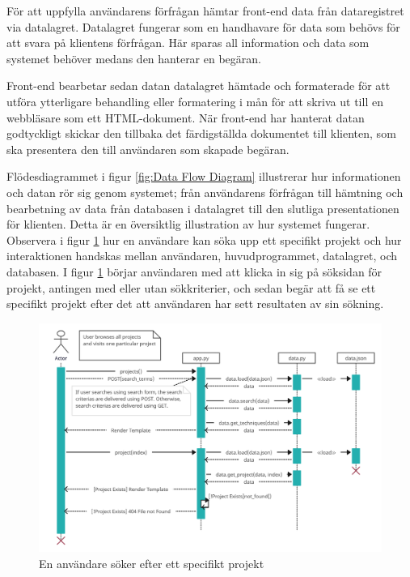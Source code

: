 \documentclass{liu_mall}
\begin{document}
        För att uppfylla användarens förfrågan hämtar front-end data från dataregistret via datalagret. Datalagret fungerar som en handhavare för data som behövs för att svara på klientens förfrågan. Här sparas all information och data som systemet behöver medans den hanterar en begäran.
        
        Front-end bearbetar sedan datan datalagret hämtade och formaterade för att utföra ytterligare behandling eller formatering i mån för att skriva ut till en webbläsare som ett HTML-dokument. När front-end har hanterat datan godtyckligt 
        skickar den tillbaka det färdigställda dokumentet till klienten, som ska presentera den till användaren som skapade begäran.
        
        Flödesdiagrammet i figur \ref{fig:Data Flow Diagram} illustrerar hur informationen och datan rör sig genom systemet; från användarens förfrågan till hämtning och bearbetning av data från databasen i datalagret till den slutliga presentationen för klienten. Detta är en översiktlig illustration av hur systemet fungerar. Observera i figur \ref{fig:Specific Use-case Scenario} hur en användare kan söka upp ett specifikt projekt och hur interaktionen handskas mellan användaren, huvudprogrammet, datalagret, och databasen. I figur \ref{fig:Specific Use-case Scenario} börjar användaren med att klicka in sig på söksidan för projekt, antingen med eller utan sökkriterier, och sedan begär att få se ett specifikt projekt efter det att användaren har sett resultaten av sin sökning.
        \begin{figure}
            \centering
            \includegraphics[scale=0.25]{Specific_User_Scenario.png}
            \caption{En användare söker efter ett specifikt projekt}
            \label{fig:Specific Use-case Scenario}
        \end{figure}
\end{document}
